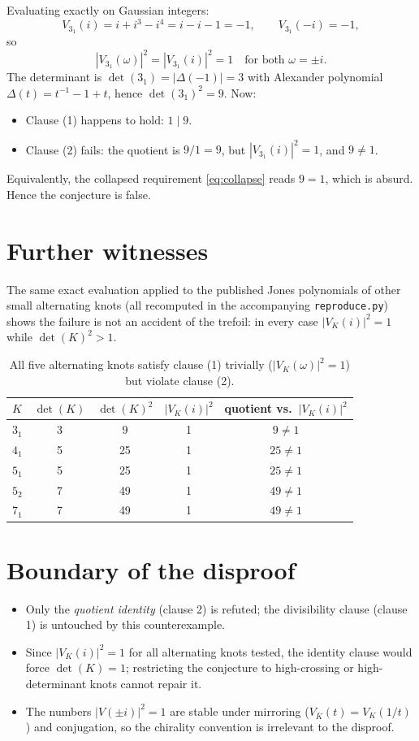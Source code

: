 \documentclass[11pt]{article}
\theoremstyle{definition}
\begin{document}
Evaluating exactly on Gaussian integers:
\[
  V_{3_1}(i) = i + i^3 - i^4 = i - i - 1 = -1, \qquad
  V_{3_1}(-i) = -1 ,
\]
so
\[
  |V_{3_1}(\omega)|^2 = |V_{3_1}(i)|^2 = 1
  \quad\text{for both } \omega = \pm i .
\]
The determinant is $\det(3_1) = |\Delta(-1)| = 3$ with Alexander polynomial
$\Delta(t) = t^{-1} - 1 + t$, hence $\det(3_1)^2 = 9$.  Now:
\begin{itemize}
  \item Clause (1) happens to hold: $1 \mid 9$.
  \item Clause (2) fails: the quotient is $9/1 = 9$, but
        $|V_{3_1}(i)|^2 = 1$, and $9 \neq 1$.
\end{itemize}
Equivalently, the collapsed requirement \eqref{eq:collapse} reads
$9 = 1$, which is absurd.  Hence the conjecture is false.

\section*{Further witnesses}

The same exact evaluation applied to the published Jones polynomials of
other small alternating knots (all recomputed in the accompanying
\texttt{reproduce.py}) shows the failure is not an accident of the
trefoil: in every case $|V_K(i)|^2 = 1$ while $\det(K)^2 > 1$.

\begin{table}[h]
\centering
\begin{tabular}{lcccc}
\toprule
$K$ & $\det(K)$ & $\det(K)^2$ & $|V_K(i)|^2$ & quotient vs.\ $|V_K(i)|^2$ \\
\midrule
$3_1$ & 3 & 9  & 1 & $9 \neq 1$ \\
$4_1$ & 5 & 25 & 1 & $25 \neq 1$ \\
$5_1$ & 5 & 25 & 1 & $25 \neq 1$ \\
$5_2$ & 7 & 49 & 1 & $49 \neq 1$ \\
$7_1$ & 7 & 49 & 1 & $49 \neq 1$ \\
\bottomrule
\end{tabular}
\caption{All five alternating knots satisfy clause (1) trivially
($|V_K(\omega)|^2 = 1$) but violate clause (2).}
\end{table}

\section*{Boundary of the disproof}

\begin{itemize}
  \item Only the \emph{quotient identity} (clause 2) is refuted; the
        divisibility clause (clause 1) is untouched by this counterexample.
  \item Since $|V_K(i)|^2 = 1$ for all alternating knots tested, the
        identity clause would force $\det(K) = 1$; restricting the
        conjecture to high-crossing or high-determinant knots cannot
        repair it.
  \item The numbers $|V(\pm i)|^2 = 1$ are stable under mirroring
        ($V_{\bar K}(t) = V_K(1/t)$) and conjugation, so the chirality
        convention is irrelevant to the disproof.
\end{itemize}
\end{document}
